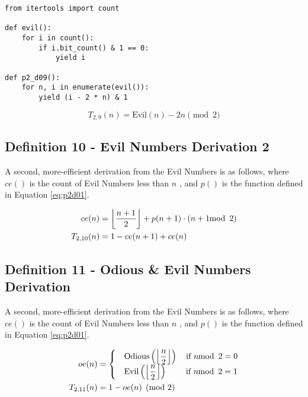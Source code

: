 \documentclass[conference]{IEEEtran}
\begin{document}
\noindent\begin{minipage}[H]{0.48\textwidth}\begin{lstlisting}[style=pythonstyle]
from itertools import count

def evil():
    for i in count():
        if i.bit_count() & 1 == 0:
            yield i

def p2_d09():
    for n, i in enumerate(evil()):
        yield (i - 2 * n) & 1
\end{lstlisting}\end{minipage}

\begin{equation}
\label{eq:p2d09}
T_{2,9}(n) = \text{Evil}(n) - 2n \pmod{2}
\end{equation}

\subsection{Definition 10 - Evil Numbers Derivation 2}


A second, more-efficient derivation from the Evil Numbers is as follows, where $ce()$ is the count of Evil Numbers less than $n$ \cite{OEIS-A159481}, and $p()$ is the function defined in Equation \ref{eq:p2d01}.

\begin{equation}
    \label{eq:p2d10}
    \begin{aligned}
     ce(n) &= \floor{\dfrac{n + 1}{2}} + p(n + 1) \cdot (n + 1 \mod{2}) \\
T_{2,10}(n) &= 1 - ce(n + 1) + ce(n)
    \end{aligned}
\end{equation}

\subsection{Definition 11 - Odious \& Evil Numbers Derivation}


A second, more-efficient derivation from the Evil Numbers is as follows, where $ce()$ is the count of Evil Numbers less than $n$ \cite{OEIS-A159481}, and $p()$ is the function defined in Equation \ref{eq:p2d01}.

\begin{equation}
    \label{eq:p2d11}
    \begin{aligned}
     oe(n) &= \begin{cases}
         &\text{Odious}\left(\floor{\dfrac{n}{2}}\right) \quad \text{if } n \mod{2} = 0 \\
         &\text{Evil}\left(\floor{\dfrac{n}{2}}\right) \quad\quad\; \text{if } n \mod{2} = 1
     \end{cases} \\
T_{2,11}(n) &= 1 - oe(n) \pmod{2}
    \end{aligned}
\end{equation}
\end{document}
